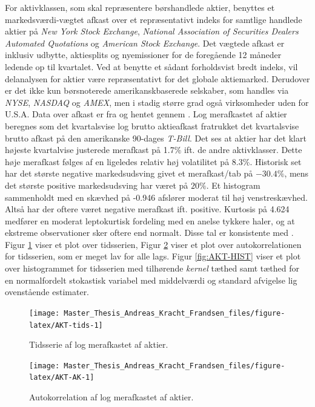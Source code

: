 \documentclass[
  a4paper,
  oneside]{memoir}
\begin{document}
For aktivklassen, som skal repræsentere børshandlede aktier, benyttes et markedsværdi-vægtet afkast over et repræsentativt indeks for samtlige handlede aktier på \emph{New York Stock Exchange}, \emph{National Association of Securities Dealers Automated Quotations} og \emph{American Stock Exchange}. Det vægtede afkast er inklusiv udbytte, aktiesplits og nyemissioner for de foregående 12 måneder ledende op til kvartalet. Ved at benytte et sådant forholdsvist bredt indeks, vil delanalysen for aktier være repræsentativt for det globale aktiemarked. Derudover er det ikke kun børsnoterede amerikanskbaserede selskaber, som handles via \emph{NYSE}, \emph{NASDAQ} og \emph{AMEX}, men i stadig større grad også virksomheder uden for U.S.A. Data over afkast er fra \citep{CRSPakt} og hentet gennem \citep{WRDSakt}. Log merafkastet af aktier beregnes som det kvartalsvise log brutto aktieafkast fratrukket det kvartalsvise brutto afkast på den amerikanske 90-dages \emph{T-Bill}. Det ses at aktier har det klart højeste kvartalvise justerede merafkast på 1.7\(\%\) ift. de andre aktivklasser. Dette høje merafkast følges af en ligeledes relativ høj volatilitet på 8.3\(\%\). Historisk set har det største negative markedsudsving givet et merafkast/tab på \(-30.4\%\), mens det største positive markedsudsving har været på \(20\%\). Et histogram sammenholdt med en skævhed på -0.946 afslører moderat til høj venstreskævhed. Altså har der oftere været negative merafkast ift. positive. Kurtosis på 4.624 medfører en moderat leptokurtisk fordeling med en anelse tykkere haler, og at ekstreme observationer sker oftere end normalt. Disse tal er konsistente med \citep{CampVic2003}. Figur \ref{fig:AKT-tids} viser et plot over tidsserien, Figur \ref{fig:AKT-AK} viser et plot over autokorrelationen for tidsserien, som er meget lav for alle lags. Figur \ref{fig:AKT-HIST} viser et plot over histogrammet for tidsserien med tilhørende \emph{kernel} tæthed samt tæthed for en normalfordelt stokastisk variabel med middelværdi og standard afvigelse lig ovenstående estimater.

\begin{figure}[H]

{\centering \texttt{[image: Master\_Thesis\_Andreas\_Kracht\_Frandsen\_files/figure-latex/AKT-tids-1]} 

}

\caption{Tidsserie af log merafkastet af aktier.}\label{fig:AKT-tids}
\end{figure}

\begin{figure}[H]

{\centering \texttt{[image: Master\_Thesis\_Andreas\_Kracht\_Frandsen\_files/figure-latex/AKT-AK-1]} 

}

\caption{Autokorrelation af log merafkastet af aktier.}\label{fig:AKT-AK}
\end{figure}
\end{document}
